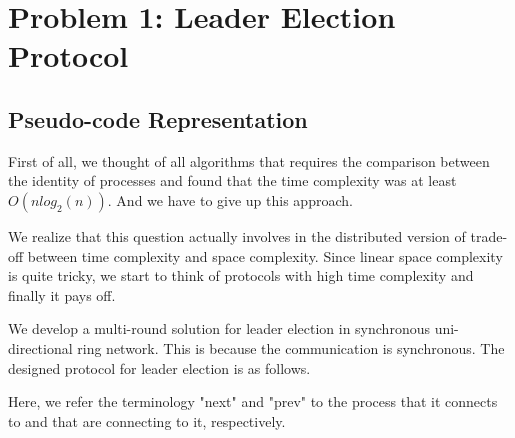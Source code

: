 \documentclass[11pt,a4paper]{article}
\begin{document}
\begin{titlepage}
    \maketitle
\end{titlepage}
\renewcommand{\contentsname}{Contents}
\begin{center} 
    \tableofcontents 
\end{center}
\newpage

\section{Problem 1: Leader Election Protocol}
\subsection{Pseudo-code Representation}
First of all, we thought of all algorithms that requires the comparison between
the identity of processes and found that the time complexity was at least
$O(n log_2(n))$. And we have to give up this approach.

We realize that this question actually involves in the distributed version of
trade-off between time complexity and space complexity. Since linear space
complexity is quite tricky, we start to think of protocols with high time
complexity and finally it pays off.

We develop a multi-round solution for leader election in synchronous
uni-directional ring network. This is because the communication is
synchronous. The designed protocol for leader election is as follows. 

Here, we refer the terminology "next" and "prev" to the process that it
connects to and that are connecting to it, respectively.

\begin{algorithm}[H]
\end{algorithm}
\end{document}
